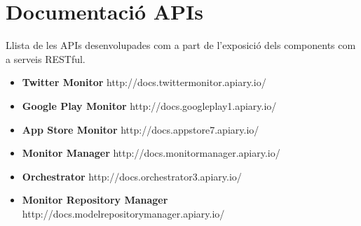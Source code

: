 
\chapter{Documentació APIs} %

\label{APIs} %

Llista de les APIs desenvolupades com a part de l'exposició dels components com a serveis RESTful.\\

\begin{itemize}
\item \textbf{Twitter Monitor}
\subitem http://docs.twittermonitor.apiary.io/
\item \textbf{Google Play Monitor}
\subitem http://docs.googleplay1.apiary.io/
\item \textbf{App Store Monitor}
\subitem http://docs.appstore7.apiary.io/
\item \textbf{Monitor Manager}
\subitem http://docs.monitormanager.apiary.io/
\item \textbf{Orchestrator}
\subitem http://docs.orchestrator3.apiary.io/
\item \textbf{Monitor Repository Manager}
http://docs.modelrepositorymanager.apiary.io/

\end{itemize}